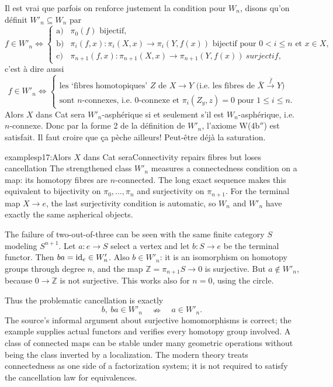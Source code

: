 Il est vrai que parfois on renforce justement la condition pour $W_n$, disons qu'on définit $W'_n \subseteq W_n$ par
\[
f \in W'_n \iff \left\{
\begin{array}{ll}
\text{a)} & \pi_0(f) \text{ bijectif,} \\[1ex]
\text{b)} & \pi_i(f,x) : \pi_i(X,x) \longrightarrow \pi_i(Y,f(x)) \text{ bijectif pour } 0 < i \leq n \text{ et } x \in X, \\[1ex]
\text{c)} & \pi_{n+1}(f,x) : \pi_{n+1}(X,x) \longrightarrow \pi_{n+1}(Y,f(x)) \ \textit{surjectif,}
\end{array}
\right.
\]
c'est à dire aussi
\[
f \in W'_n \iff \left\{
\begin{array}{l}
\text{les `fibres homotopiques' } Z \text{ de } X \longrightarrow Y \text{ (i.e. les fibres de } \bar{X} \xrightarrow{\bar{f}} Y\text{)} \\
\text{sont } n\text{-connexes, i.e. 0-connexe et } \pi_i(Z_y,z) = 0 \text{ pour } 1 \leq i \leq n.
\end{array}
\right.
\]
Alors $X$ dans Cat sera $W'_n$-asphérique si et seulement s'il est $W_n$-asphérique, i.e. $n$-connexe. Donc par la forme 2 de la définition de $W'_n$, l'axiome W(4b$''$) est satisfait. Il faut croire que ça pèche ailleurs! Peut-être déjà la saturation.

\begin{dcomment}{examples}{p17:Alors $X$ dans Cat sera}{Connectivity repairs fibres but loses cancellation}
The strengthened class \(W'_n\) measures a connectedness condition on a map: its homotopy fibres are \(n\)-connected. The long exact sequence makes this equivalent to bijectivity on \(\pi_0,\ldots,\pi_n\) and surjectivity on \(\pi_{n+1}\). For the terminal map \(X\to e\), the last surjectivity condition is automatic, so \(W_n\) and \(W'_n\) have exactly the same aspherical objects.

The failure of two-out-of-three can be seen with the same finite category \(S\) modeling \(S^{n+1}\). Let \(a:e\to S\) select a vertex and let \(b:S\to e\) be the terminal functor. Then \(ba=\mathrm{id}_e\in W'_n\). Also \(b\in W'_n\): it is an isomorphism on homotopy groups through degree \(n\), and the map \(\mathbb Z=\pi_{n+1}S\to0\) is surjective. But \(a\notin W'_n\), because \(0\to\mathbb Z\) is not surjective. This works also for \(n=0\), using the circle.

Thus the problematic cancellation is exactly
\[
 b,\ ba\in W'_n\quad\nRightarrow\quad a\in W'_n.
\]
The source's informal argument about surjective homomorphisms is correct; the example supplies actual functors and verifies every homotopy group involved. A class of connected maps can be stable under many geometric operations without being the class inverted by a localization. The modern theory treats connectedness as one side of a factorization system; it is not required to satisfy the cancellation law for equivalences.
\end{dcomment}


